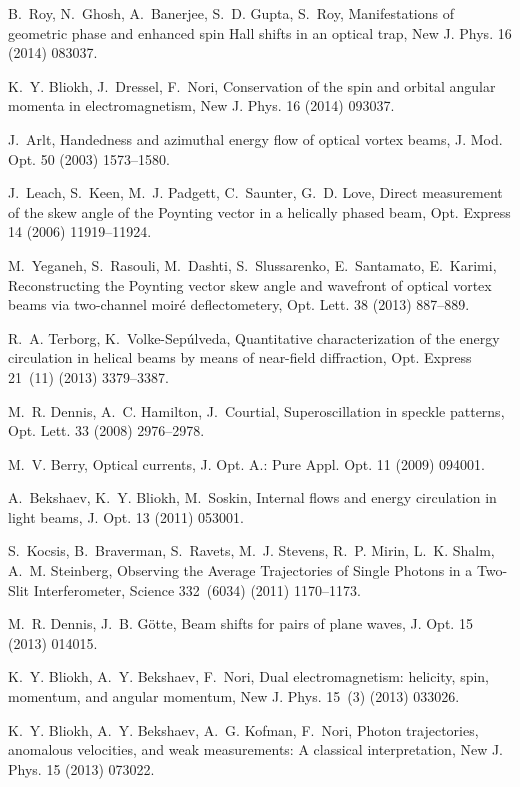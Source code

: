 \documentclass[1p,sort&compress]{elsarticle}
\numberwithin{equation}{section}
\begin{document}
\begin{thebibliography}{999}
B.~Roy, N.~Ghosh, A.~Banerjee, S.~D. Gupta, S.~Roy, {Manifestations of
  geometric phase and enhanced spin Hall shifts in an optical trap}, New J.
  Phys. 16 (2014) 083037.

K.~Y. Bliokh, J.~Dressel, F.~Nori, {Conservation of the spin and orbital
  angular momenta in electromagnetism}, New J. Phys. 16 (2014) 093037.

J.~Arlt, {Handedness and azimuthal energy flow of optical vortex beams}, J.
  Mod. Opt. 50 (2003) 1573--1580.

J.~Leach, S.~Keen, M.~J. Padgett, C.~Saunter, G.~D. Love, {Direct measurement
  of the skew angle of the Poynting vector in a helically phased beam}, Opt.
  Express 14 (2006) 11919--11924.

M.~Yeganeh, S.~Rasouli, M.~Dashti, S.~Slussarenko, E.~Santamato, E.~Karimi,
  {Reconstructing the Poynting vector skew angle and wavefront of optical
  vortex beams via two-channel moir\'e deflectometery}, Opt. Lett. 38 (2013)
  887--889.

R.~A. Terborg, K.~Volke-Sep\'ulveda, {Quantitative characterization of the
  energy circulation in helical beams by means of near-field diffraction}, Opt.
  Express 21~(11) (2013) 3379--3387.

M.~R. Dennis, A.~C. Hamilton, J.~Courtial, {Superoscillation in speckle
  patterns}, Opt. Lett. 33 (2008) 2976--2978.

M.~V. Berry, {Optical currents}, J. Opt. A.: Pure Appl. Opt. 11 (2009) 094001.

A.~Bekshaev, K.~Y. Bliokh, M.~Soskin, {Internal flows and energy circulation in
  light beams}, J. Opt. 13 (2011) 053001.

S.~Kocsis, B.~Braverman, S.~Ravets, M.~J. Stevens, R.~P. Mirin, L.~K. Shalm,
  A.~M. Steinberg, {Observing the Average Trajectories of Single Photons in a
  Two-Slit Interferometer}, Science 332~(6034) (2011) 1170--1173.

M.~R. Dennis, J.~B. G\"otte, {Beam shifts for pairs of plane waves}, J. Opt. 15
  (2013) 014015.

K.~Y. Bliokh, A.~Y. Bekshaev, F.~Nori, {Dual electromagnetism: helicity, spin,
  momentum, and angular momentum}, New J. Phys. 15~(3) (2013) 033026.

K.~Y. Bliokh, A.~Y. Bekshaev, A.~G. Kofman, F.~Nori, {Photon trajectories,
  anomalous velocities, and weak measurements: A classical interpretation}, New
  J. Phys. 15 (2013) 073022.


\end{thebibliography}
\end{document}
